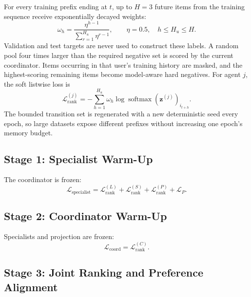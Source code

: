 \documentclass[11pt,a4paper]{article}
\newcommand{\softmax}{\operatorname{softmax}}
\begin{document}
For every training prefix ending at $t$, up to $H=3$ future items from the
training sequence receive exponentially decayed weights:
\begin{equation}
  \omega_h=\frac{\eta^{h-1}}{\sum_{r=1}^{H_u}\eta^{r-1}},
  \qquad \eta=0.5,\quad h\leq H_u\leq H.
\end{equation}
Validation and test targets are never used to construct these labels. A random
pool four times larger than the required negative set is scored by the current
coordinator. Items occurring in that user's training history are masked, and
the highest-scoring remaining items become model-aware hard negatives. For
agent $j$, the soft listwise loss is
\begin{equation}
  \mathcal L_{\mathrm{rank}}^{(j)}
  =-\sum_{h=1}^{H_u}\omega_h
    \log\softmax(\bm z^{(j)})_{i_{t+h}}.
\end{equation}
The bounded transition set is regenerated with a new deterministic seed every
epoch, so large datasets expose different prefixes without increasing one
epoch's memory budget.

\subsection{Stage 1: Specialist Warm-Up}

The coordinator is frozen:
\begin{equation}
  \mathcal L_{\mathrm{specialist}}
  =
  \mathcal L_{\mathrm{rank}}^{(L)}
  +\mathcal L_{\mathrm{rank}}^{(S)}
  +\mathcal L_{\mathrm{rank}}^{(P)}
  +\mathcal L_P.
\end{equation}

\subsection{Stage 2: Coordinator Warm-Up}

Specialists and projection are frozen:
\begin{equation}
  \mathcal L_{\mathrm{coord}}
  =
  \mathcal L_{\mathrm{rank}}^{(C)}.
\end{equation}

\subsection{Stage 3: Joint Ranking and Preference Alignment}
\end{document}
